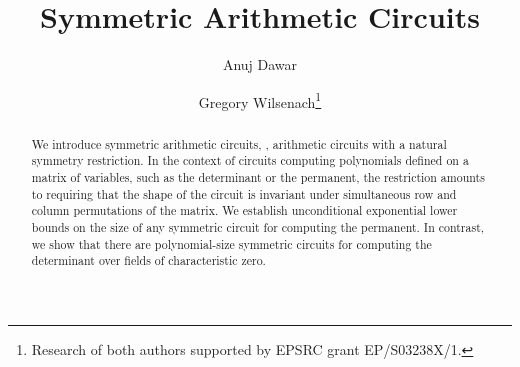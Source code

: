 \documentclass{toc}
\begin{document}
\begin{frontmatter}%
%
%
%
%
%
%
%
  \title{Symmetric Arithmetic Circuits}
%
%
%
%
%
%
%
%
%
%
%
%
%
%
%
%
%
%
%
%
%
%
\author[dawar]{Anuj Dawar}
\author[wilsenach]{Gregory Wilsenach\thanks{Research of both authors supported by EPSRC
    grant EP/S03238X/1.}}
%
%
%
%
%
%
%
%
%
%
%
%
\begin{abstract}
  We introduce symmetric arithmetic circuits, \ie, arithmetic circuits with a
natural symmetry restriction. In the context of circuits computing polynomials
defined on a matrix of variables, such as the determinant or the permanent, the
restriction amounts to requiring that the shape of the circuit is invariant
under simultaneous row and column permutations of the matrix.  We establish
unconditional exponential lower bounds on the size of any symmetric circuit
for computing the permanent.  In contrast, we show that there
are polynomial-size symmetric circuits for computing the determinant
over fields of characteristic zero.
\end{abstract}
%
\end{frontmatter}
%
%
%
\end{document}
